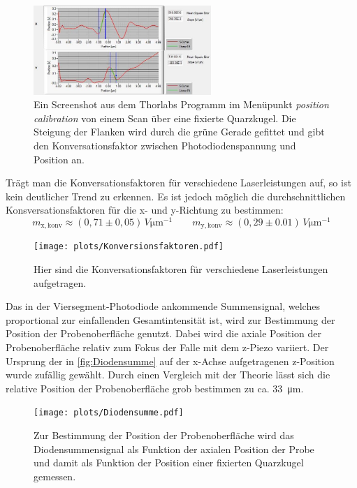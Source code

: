     \begin{figure}[ht]
        \centering\captionsetup{format=plain}
        \includegraphics[width=0.6\textwidth]{bilder/PosCal_200mA.JPG}
        \caption{Ein Screenshot aus dem Thorlabs Programm im Menüpunkt \glqq \textit{position calibration} von einem Scan über eine fixierte Quarzkugel. Die Steigung der Flanken wird durch die grüne Gerade gefittet und gibt den Konversationsfaktor zwischen Photodiodenspannung und Position an.}
        \label{fig:PosCal_200mA}
    \end{figure}
    \FloatBarrier
    Trägt man die Konversationsfaktoren für verschiedene Laserleistungen auf, so ist kein deutlicher Trend zu erkennen.
    Es ist jedoch möglich die durchschnittlichen Konsversationsfaktoren für die x- und y-Richtung zu bestimmen:
    \begin{equation*}
        m_{\mathrm{x,konv}} \approx (0,71 \pm 0,05)\,\si{V \um^{-1}} \qquad m_{\mathrm{y,konv}} \approx (0,29 \pm 0.01)\,\si{V \um^{-1}}
    \end{equation*}
    \begin{figure}[ht]
        \centering\captionsetup{format=plain}
        \texttt{[image: plots/Konversionsfaktoren.pdf]} \vspace*{-0.5cm}
        \caption{Hier sind die Konversationsfaktoren für verschiedene Laserleistungen aufgetragen.}
        \label{fig:Konversionsfaktoren}
    \end{figure}
    \FloatBarrier
    Das in der Viersegment-Photodiode ankommende Summensignal, welches proportional zur einfallenden Gesamtintensität ist, wird zur Bestimmung der Position der Probenoberfläche genutzt.
    Dabei wird die axiale Position der Probenoberfläche relativ zum Fokus der Falle mit dem z-Piezo variiert.
    Der Ursprung der in \autoref{fig:Diodensumme} auf der x-Achse aufgetragenen z-Position wurde zufällig gewählt.
    Durch einen Vergleich mit der Theorie lässt sich die relative Position der Probenoberfläche grob bestimmen zu ca. \qty{33}{\um}.
    \begin{figure}[ht]
        \centering\captionsetup{format=plain}
        \texttt{[image: plots/Diodensumme.pdf]} \vspace*{-0.5cm}
        \caption{Zur Bestimmung der Position der Probenoberfläche wird das Diodensummensignal als Funktion der axialen Position der Probe und damit als Funktion der Position einer fixierten Quarzkugel gemessen.}
        \label{fig:Diodensumme}
    \end{figure}
    \FloatBarrier

